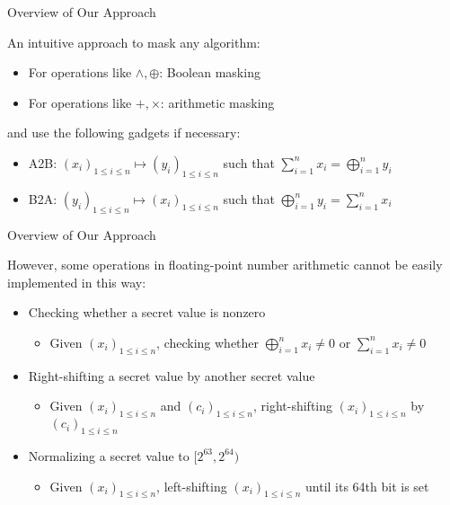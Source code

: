 \begin{frame}{Overview of Our Approach}

An intuitive approach to mask any algorithm:
\pause

\begin{itemize}
\item For operations like $\wedge, \oplus$: Boolean masking
\pause
\item For operations like $+, \times$: arithmetic masking
\end{itemize}
\pause
and use the following gadgets if necessary:
\pause
\begin{itemize}
	\item {\sf A2B}: $(x_i)_{1\leq i \leq n} \mapsto (y_i)_{1\leq i \leq n}$ such that $\sum_{i=1}^n x_i = \bigoplus_{i=1}^n y_i$
	\pause
	\item {\sf B2A}: $(y_i)_{1\leq i \leq n} \mapsto (x_i)_{1\leq i \leq n}$ such that $\bigoplus_{i=1}^n y_i = \sum_{i=1}^n x_i$
\end{itemize}

\end{frame}


\begin{frame}{Overview of Our Approach}

However, some operations in floating-point number arithmetic cannot be easily implemented in this way:
\pause
\begin{itemize}
	\item Checking whether a secret value is nonzero
	\begin{itemize}
		\item Given $(x_i)_{1\leq i \leq n}$, checking whether $\bigoplus_{i=1}^n x_i \neq 0$ or $\sum_{i=1}^n x_i \neq 0$
	\end{itemize}
	\pause
	\item Right-shifting a secret value by another secret value
	\begin{itemize}
		\item Given $(x_i)_{1\leq i \leq n}$ and $(c_i)_{1\leq i \leq n}$, right-shifting $(x_i)_{1\leq i \leq n}$ by $(c_i)_{1\leq i \leq n}$
	\end{itemize}
	\pause
	\item Normalizing a secret value to $[2^{63},2^{64})$
	\begin{itemize}
		\item Given $(x_i)_{1\leq i \leq n}$, left-shifting $(x_i)_{1\leq i \leq n}$ until its 64th bit is set
	\end{itemize}
\end{itemize}

\end{frame}

